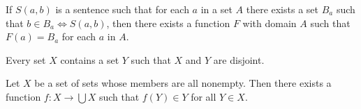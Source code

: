 \begin{axiom}[Substitution]
  If $S(a,b)$ is a sentence such that for each $a$ in a set $A$ there exists a
  set $B_a$ such that $b\in B_a\iff S(a,b)$, then there exists a function $F$ with
  domain $A$ such that $F(a)=B_a$ for each $a$ in $A$.
\end{axiom}
\begin{axiom}[Foundation]
  Every set $X$ contains a set $Y$ such that $X$ and $Y$ are disjoint.
\end{axiom}
\begin{axiom}[Choice]
  Let $X$ be a set of sets whose members are all nonempty. Then there exists a
  function $f:X\to\bigcup X$ such that $f(Y)\in Y$ for all $Y\in X$.
\end{axiom}
